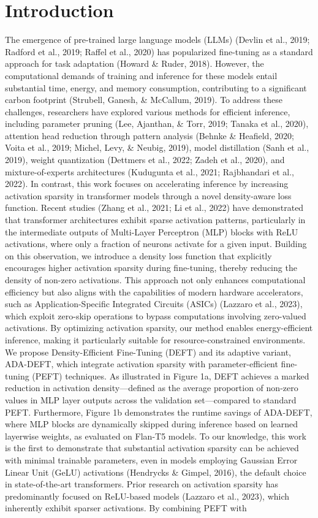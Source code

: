 \documentclass[conference]{IEEEtran}
\begin{document}
\section{Introduction}

The emergence of pre-trained large language models (LLMs) (Devlin et al., 2019; Radford et al., 2019; Raffel et al., 2020) has popularized fine-tuning as a standard approach for task adaptation (Howard \& Ruder, 2018). However, the computational demands of training and inference for these models entail substantial time, energy, and memory consumption, contributing to a significant carbon footprint (Strubell, Ganesh, \& McCallum, 2019). To address these challenges, researchers have explored various methods for efficient inference, including parameter pruning (Lee, Ajanthan, \& Torr, 2019; Tanaka et al., 2020), attention head reduction through pattern analysis (Behnke \& Heafield, 2020; Voita et al., 2019; Michel, Levy, \& Neubig, 2019), model distillation (Sanh et al., 2019), weight quantization (Dettmers et al., 2022; Zadeh et al., 2020), and mixture-of-experts architectures (Kudugunta et al., 2021; Rajbhandari et al., 2022). In contrast, this work focuses on accelerating inference by increasing activation sparsity in transformer models through a novel density-aware loss function. Recent studies (Zhang et al., 2021; Li et al., 2022) have demonstrated that transformer architectures exhibit sparse activation patterns, particularly in the intermediate outputs of Multi-Layer Perceptron (MLP) blocks with ReLU activations, where only a fraction of neurons activate for a given input. Building on this observation, we introduce a density loss function that explicitly encourages higher activation sparsity during fine-tuning, thereby reducing the density of non-zero activations. This approach not only enhances computational efficiency but also aligns with the capabilities of modern hardware accelerators, such as Application-Specific Integrated Circuits (ASICs) (Lazzaro et al., 2023), which exploit zero-skip operations to bypass computations involving zero-valued activations. By optimizing activation sparsity, our method enables energy-efficient inference, making it particularly suitable for resource-constrained environments. We propose Density-Efficient Fine-Tuning (DEFT) and its adaptive variant, ADA-DEFT, which integrate activation sparsity with parameter-efficient fine-tuning (PEFT) techniques. As illustrated in Figure 1a, DEFT achieves a marked reduction in activation density—defined as the average proportion of non-zero values in MLP layer outputs across the validation set—compared to standard PEFT. Furthermore, Figure 1b demonstrates the runtime savings of ADA-DEFT, where MLP blocks are dynamically skipped during inference based on learned layerwise weights, as evaluated on Flan-T5 models. To our knowledge, this work is the first to demonstrate that substantial activation sparsity can be achieved with minimal trainable parameters, even in models employing Gaussian Error Linear Unit (GeLU) activations (Hendrycks \& Gimpel, 2016), the default choice in state-of-the-art transformers. Prior research on activation sparsity has predominantly focused on ReLU-based models (Lazzaro et al., 2023), which inherently exhibit sparser activations. By combining PEFT with 
\end{document}
